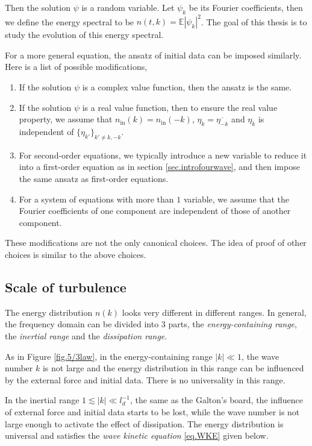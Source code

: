 Then the solution $\psi$ is a random variable. Let $\psi_k$ be its Fourier coefficients, then we define the energy spectral to be $n(t,k)=\mathbb{E}|\psi_k|^2$. The goal of this thesis is to study the evolution of this energy spectral.

For a more general equation, the ansatz of initial data can be imposed similarly. Here is a list of possible modifications,

\begin{enumerate}
    \item If the solution $\psi$ is a complex value function, then the ansatz is the same.
    \item If the solution $\psi$ is a real value function, then to ensure the real value property, we assume that $n_{\textrm{in}}(k)=n_{\textrm{in}}(-k)$, $\eta_k=\overline{\eta_{-k}}$ and $\eta_k$ is independent of $\{\eta_{k'}\}_{k'\ne k,-k}$. 
    \item For second-order equations, we typically introduce a new variable to reduce it into a first-order equation as in section \ref{sec.introfourwave}, and then impose the same ansatz as first-order equations. 
    \item For a system of equations with more than $1$ variable, we assume that the Fourier coefficients of one component are independent of those of another component.
\end{enumerate}

These modifications are not the only canonical choices. The idea of proof of other choices is similar to the above choices.




\subsection{Scale of turbulence}

The energy distribution $n(k)$ looks very different in different ranges. In general, the frequency domain can be divided into 3 parts, the \textit{energy-containing range}, the \textit{inertial range} and the \textit{dissipation range}.

As in Figure \ref{fig.5/3law}, in the energy-containing range $|k|\ll 1$, the wave number $k$ is not large and the energy distribution in this range can be influenced by the external force and initial data. There is no universality in this range. 


In the inertial range $1\lesssim |k|\ll l_d^{-1}$, the same as the Galton's board, the influence of external force and initial data starts to be lost, while the wave number is not large enough to activate the effect of dissipation. The energy distribution is universal and satisfies the \textit{wave kinetic equation} \eqref{eq.WKE} given below.


